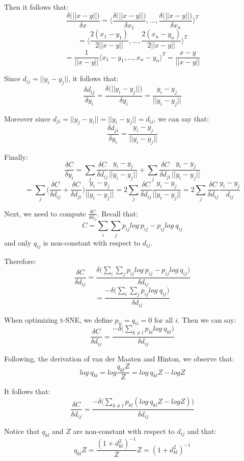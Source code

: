\documentclass[a4paper]{article}
\begin{document}
\begin{enumerate}
{Then it follows that:
$$\frac{\delta \Big( ||x - y || \Big) }{\delta x} = \Big \langle \frac{\delta \Big( ||x - y || \Big) }{\delta x_1}, ..., \frac{\delta \Big( ||x - y || \Big) }{\delta x_n} \Big \rangle^T $$
$$ = \Big \langle \frac{2(x_1 - y_1) }{ 2 ||x-y|| }, ..., \frac{ 2(x_n - y_n)}{ 2 ||x-y|| } \Big \rangle^T $$
$$ = \frac{1}{||x-y||}\Big \langle x_1-y_1, ..., x_n - y_n \Big \rangle ^T = \frac{x-y}{||x-y||} $$

Since $d_{ij} = ||y_i - y_j || $, it follows that:
$$\frac{\delta d_{ij}  }{\delta y_i} = \frac{\delta \Big( ||y_i - y_j || \Big) }{\delta y_i} = \frac{y_i - y_j}{ ||y_i - y_j ||} $$

Moreover since $d_{ji} = ||y_j - y_i || = ||y_i - y_j ||  = d_{ij} $, we can say that: 
$$\frac{\delta d_{ji}  }{\delta y_i} = \frac{y_i - y_j}{ ||y_i - y_j ||} $$

Finally:
$$\frac{\delta C }{\delta y_i} = \sum_j  \frac{\delta C }{\delta d_{ij}} \frac{y_i - y_j}{ ||y_i - y_j ||} + \sum_j  \frac{\delta C }{\delta d_{ji}} \frac{y_i - y_j}{ ||y_i - y_j ||} $$
$$ =  \sum_j  \Big( \frac{\delta C }{\delta d_{ij}} +  \frac{\delta C }{\delta d_{ji}} \Big) \frac{y_i - y_j}{ ||y_i - y_j ||} =  2 \sum_j  \frac{\delta C }{\delta d_{ij}}  \frac{y_i - y_j}{ ||y_i - y_j ||} = 2 \sum_j  \frac{\delta C }{\delta d_{ij}}  \frac{y_i - y_j}{ d_{ij} } $$

Next, we need to compute $ \frac{\delta C }{\delta d_{ij}} $. Recall that: 
$$C = \sum_i \sum_j p_{ij} log\ p_{ij} - p_{ij} log\ q_{ij}$$
and only $q_{ij}$ is non-constant with respect to $d_{ij}$. 

Therefore: 
$$\frac{ \delta C }{\delta d_{ij} } = \frac{ \delta \Big( \sum_i \sum_j p_{ij} log\ p_{ij} - p_{ij} log\ q_{ij} \Big) }{\delta d_{ij} } $$
$$ = \frac{ - \delta \Big( \sum_i \sum_j p_{ij} log\ q_{ij} \Big) }{\delta d_{ij} } $$

When optimizing t-SNE, we define $p_{ii} = q_{ii} = 0$ for all $i$. Then we can say:
$$\frac{ \delta C }{\delta d_{ij} } = \frac{ - \delta \Big( \sum_{k \neq l} p_{kl} log\ q_{kl} \Big) }{\delta d_{ij} } $$

Following, the derivation of van der Maaten and Hinton, we observe that:
$$log\ q_{kl} = log \frac{q_{kl} Z}{Z} = log\ q_{kl} Z - log Z $$

It follows that:
$$\frac{ \delta C }{\delta d_{ij} } = \frac{ - \delta \Big( \sum_{k \neq l} p_{kl} (log\ q_{kl} Z - log Z) \Big) }{\delta d_{ij} } $$

Notice that $q_{kl}$ and $Z$ are non-constant with respect to $d_{ij}$ and that:
$$q_{kl} Z =  \frac{(1+d_{kl}^2)^{-1} }{  Z } Z = (1+d_{kl}^2)^{-1} $$

}
\end{enumerate}
\end{document}
